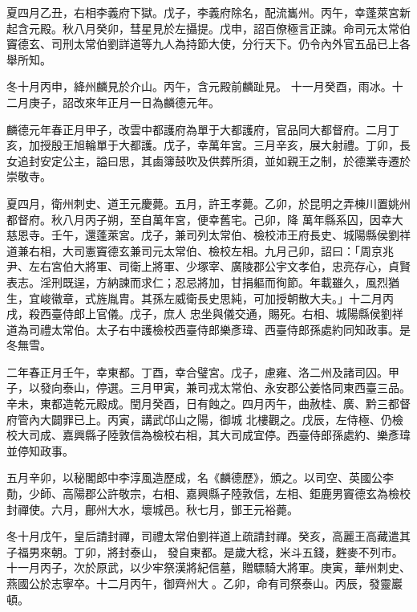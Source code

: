 \begin{pinyinscope}
 夏四月乙丑，右相李義府下獄。戊子，李義府除名，配流巂州。丙午，幸蓬萊宮新起含元殿。秋八月癸卯，彗星見於左攝提。戊申，詔百僚極言正諫。命司元太常伯竇德玄、司刑太常伯劉詳道等九人為持節大使，分行天下。仍令內外官五品已上各舉所知。



 冬十月丙申，絳州麟見於介山。丙午，含元殿前麟趾見。
 十一月癸酉，雨冰。十二月庚子，詔改來年正月一日為麟德元年。



 麟德元年春正月甲子，改雲中都護府為單于大都護府，官品同大都督府。二月丁亥，加授殷王旭輪單于大都護。戊子，幸萬年宮。三月辛亥，展大射禮。丁卯，長女追封安定公主，謚曰思，其鹵簿鼓吹及供葬所須，並如親王之制，於德業寺遷於崇敬寺。



 夏四月，衛州刺史、道王元慶薨。五月，許王孝薨。乙卯，於昆明之弄棟川置姚州都督府。秋八月丙子朔，至自萬年宮，便幸舊宅。己卯，降
 萬年縣系囚，因幸大慈恩寺。壬午，還蓬萊宮。戊子，兼司列太常伯、檢校沛王府長史、城陽縣侯劉祥道兼右相，大司憲竇德玄兼司元太常伯、檢校左相。九月己卯，詔曰：「周京兆尹、左右宮伯大將軍、司衛上將軍、少塚宰、廣陵郡公宇文孝伯，忠亮存心，貞賢表志。淫刑既逞，方納諫而求仁；忍忌將加，甘捐軀而徇節。年載雖久，風烈猶生，宜峻徽章，式旌胤胄。其孫左威衛長史思純，可加授朝散大夫。」十二月丙戌，殺西臺侍郎上官儀。戊子，庶人
 忠坐與儀交通，賜死。右相、城陽縣侯劉祥道為司禮太常伯。太子右中護檢校西臺侍郎樂彥瑋、西臺侍郎孫處約同知政事。是冬無雪。



 二年春正月壬午，幸東都。丁酉，幸合璧宮。戊子，慮雍、洛二州及諸司囚。甲子，以發向泰山，停選。三月甲寅，兼司戎太常伯、永安郡公姜恪同東西臺三品。辛未，東都造乾元殿成。閏月癸酉，日有蝕之。四月丙午，曲赦桂、廣、黔三都督府管內大闢罪已上。丙寅，講武邙山之陽，御城
 北樓觀之。戊辰，左侍極、仍檢校大司成、嘉興縣子陸敦信為檢校右相，其大司成宜停。西臺侍郎孫處約、樂彥瑋並停知政事。



 五月辛卯，以秘閣郎中李淳風造歷成，名《麟德歷》，頒之。以司空、英國公李勣，少師、高陽郡公許敬宗，右相、嘉興縣子陸敦信，左相、鉅鹿男竇德玄為檢校封禪使。六月，鄜州大水，壞城邑。秋七月，鄧王元裕薨。



 冬十月戊午，皇后請封禪，司禮太常伯劉祥道上疏請封禪。癸亥，高麗王高藏遣其子福男來朝。丁卯，將封泰山，
 發自東都。是歲大稔，米斗五錢，麰麥不列市。十一月丙子，次於原武，以少牢祭漢將紀信墓，贈驃騎大將軍。庚寅，華州刺史、燕國公於志寧卒。十二月丙午，御齊州大。乙卯，命有司祭泰山。丙辰，發靈巖頓。



\end{pinyinscope}